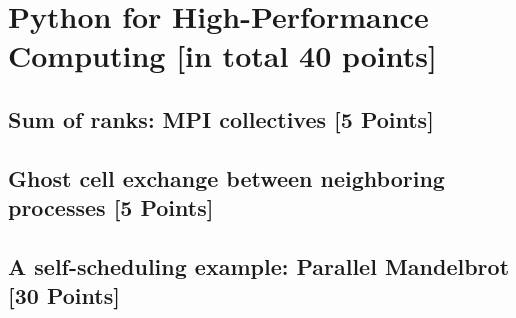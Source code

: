 \documentclass[unicode,11pt,a4paper,oneside,numbers=endperiod,openany]{scrartcl}
\begin{document}
\section{Python for High-Performance Computing [in total 40 points]}

\subsection{Sum of ranks: MPI collectives [5 Points]}

\subsection{Ghost cell exchange between neighboring processes [5 Points]}

\subsection{A self-scheduling example: Parallel Mandelbrot [30 Points]}
\end{document}
